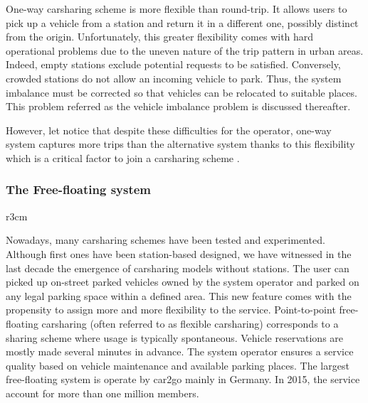 \begin{bibunit}[ieeetr]
One-way carsharing scheme is more flexible than round-trip.
It allows users to pick up a vehicle from a station and return it in a different one, possibly distinct from the origin.
Unfortunately, this greater flexibility comes with hard operational problems due to the uneven nature of the trip pattern in urban areas.
Indeed, empty stations exclude potential requests to be satisfied.
Conversely, crowded stations do not allow an incoming vehicle to park.
Thus, the system imbalance must be corrected so that vehicles can be relocated to suitable places.
This problem referred as the vehicle imbalance problem is discussed thereafter.

However, let notice that despite these difficulties for the operator, one-way system captures more trips than the alternative system thanks to this flexibility which is a critical factor to join a carsharing scheme \cite{efthymiou_which_2012}.


\subsubsection{The Free-floating system}

\begin{wrapfigure}[6]{r}{3cm}
\vspace{-.4cm}
\centering
{}
\end{wrapfigure}

Nowadays, many carsharing schemes have been tested and experimented.
Although first ones have been station-based designed, we have witnessed in the last decade the emergence of carsharing models without stations.
The user can picked up on-street parked vehicles owned by the system operator and parked on any legal parking space within a defined area.
This new feature comes with the propensity to assign more and more flexibility to the service.
Point-to-point free-floating carsharing (often referred to as flexible carsharing) corresponds to a sharing scheme where usage is typically spontaneous.
Vehicle reservations are mostly made several minutes in advance.
The system operator ensures a service quality based on vehicle maintenance and available parking places.
The largest free-floating system is operate by car2go mainly in Germany.
In 2015, the service account for more than one million members.


\end{bibunit}
